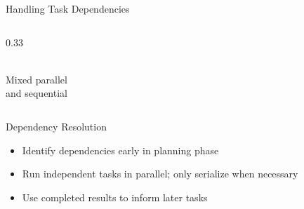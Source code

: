 \documentclass[aspectratio=169,11pt]{beamer}
\begin{document}
\begin{frame}{Handling Task Dependencies}
\begin{columns}[T]
\begin{column}{0.33\textwidth}
\begin{center}
\\[5pt]
\scriptsize Mixed parallel\\and sequential
\end{center}
\end{column}
\end{columns}

\vspace{0.3cm}
\begin{block}{Dependency Resolution}
\begin{itemize}
    \item Identify dependencies early in planning phase
    \item Run independent tasks in parallel; only serialize when necessary
    \item Use completed results to inform later tasks
\end{itemize}
\end{block}
\end{frame}
\end{document}
